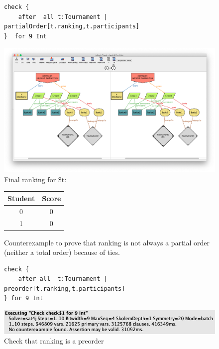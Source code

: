\begin{figure}[h]
\caption{Counterexample to prove that ranking is not always a partial order (neither a total order)  because of ties.}

\centering
\begin{lstlisting}[language=alloy]
check {
	after  all t:Tournament | partialOrder[t.ranking,t.participants]
}  for 9 Int
\end{lstlisting}

\includegraphics[width=\textwidth]{Images/Counterexample.png}
Final ranking for \$t:

\begin{tabular}{c|c}
    Student & Score \\
    \hline
    0 & 0 \\
    1 & 0 \\
\end{tabular}
\end{figure}

\begin{figure}[h]
\caption{Check that ranking is a preorder}

\centering
\begin{lstlisting}[language=alloy]
check {
	after all  t:Tournament |  preorder[t.ranking,t.participants]
} for 9 Int
\end{lstlisting}

\includegraphics[width=\textwidth]{Images/Correct.png}
\end{figure}

